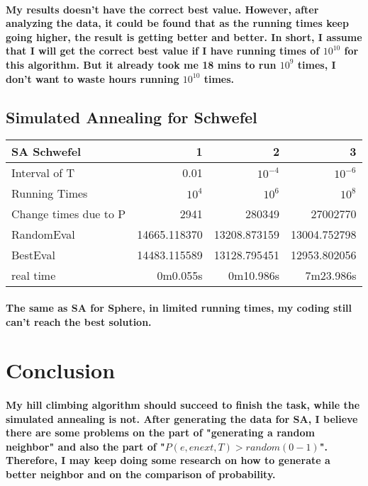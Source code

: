 \documentclass[12pt]{article}
\begin{document}
	\paragraph{My results doesn't have the correct best value. However, after analyzing the data, it could be found that as the running times keep going higher, the result is getting better and better. In short, I assume that I will get the correct best value if I have running times of $10^10$ for this algorithm. But it already took me 18 mins to run $10^9$ times, I don't want to waste hours running $10^{10}$ times.}
	
	\subsection{Simulated Annealing for Schwefel}
	\begin{center}
	\begin{tabular}{|l|r|r|r|}
	\hline
	\bf SA Schwefel & \bf 1 & \bf 2 & \bf 3 \\
	\hline
	Interval of T & 0.01 & $10^{-4}$ & $10^{-6}$\\
	Running Times & $10^4$ & $10^6$ & $10^8$\\
	Change times due to P & 2941 & 280349 & 27002770 \\
	RandomEval & 14665.118370 & 13208.873159 & 13004.752798 \\
	BestEval & 14483.115589 & 13128.795451 & 12953.802056 \\
	real time & 0m0.055s & 0m10.986s & 7m23.986s \\
	\hline
	\end{tabular}
	\end{center}
	\paragraph{The same as SA for Sphere, in limited running times, my coding still can't reach the best solution.}
	
\section{Conclusion}
\paragraph{My hill climbing algorithm should succeed to finish the task, while the simulated annealing is not. After generating the data for SA, I believe there are some problems on the part of "generating a random neighbor" and also the part of "$P(e, enext, T) > random(0 - 1)$". Therefore, I may keep doing some research on how to generate a better neighbor and on the comparison of probability.}
\end{document}
